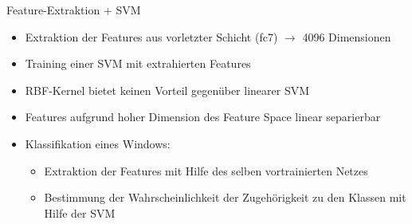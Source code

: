 \documentclass[t]{beamer}
\begin{document}
\begin{frame}{Feature-Extraktion + SVM}
\bigskip
\begin{itemize}
\item Extraktion der Features aus vorletzter Schicht (fc7) \(\rightarrow\) 4096 Dimensionen
\item Training einer SVM mit extrahierten Features
\item RBF-Kernel bietet keinen Vorteil gegen\"uber linearer SVM
\item Features aufgrund hoher Dimension des Feature Space linear separierbar
\item Klassifikation eines Windows:
\begin{itemize}
\item Extraktion der Features mit Hilfe des selben vortrainierten Netzes
\item Bestimmung der Wahrscheinlichkeit der Zugeh\"origkeit zu den Klassen mit Hilfe der SVM
\end{itemize}
\end{itemize}
\end{frame}


\end{document}
